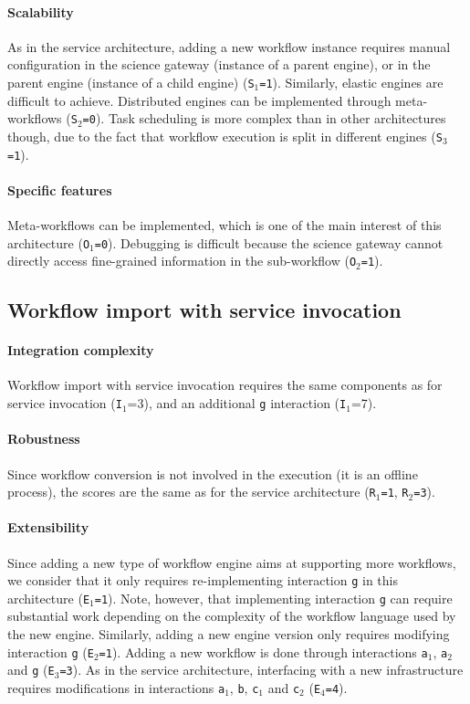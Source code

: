 \documentclass[preprint,3p,twocolumn]{elsarticle}
\begin{document}
\paragraph{Scalability} As in the service architecture, adding a new
workflow instance requires manual configuration in the science gateway
(instance of a parent engine), or in the parent engine (instance of a
child engine) (\texttt{S$_1$=1}). Similarly, elastic engines are
difficult to achieve. Distributed engines can be implemented through meta-workflows (\texttt{S$_2$=0}). Task scheduling
is more complex than in other architectures though, due to the fact
that workflow execution is split in different engines (\texttt{S$_3$=1}).

\paragraph{Specific features}
Meta-workflows can be implemented, which is one of the main interest of this
architecture (\texttt{O$_1$=0}).  Debugging is difficult because the
science gateway cannot directly access fine-grained information in the
sub-workflow (\texttt{O$_2$=1}).

\subsection{Workflow import with service invocation}

\paragraph{Integration complexity} Workflow import with service invocation
requires the same components as for service invocation
(\texttt{I$_1$}=3), and an additional \texttt{g} interaction (\texttt{I$_1$}=7).

\paragraph{Robustness} Since workflow conversion is not involved in
the execution (it is an offline process), the scores are the same as for the
service architecture (\texttt{R$_1$=1}, \texttt{R$_2$=3}).

\paragraph{Extensibility} Since adding a new type of workflow engine
aims at supporting more workflows, we consider that it only requires
re-implementing interaction \texttt{g} in this architecture  (\texttt{E$_1$=1}). Note,
however, that implementing interaction \texttt{g} can require
substantial work depending on the complexity of the workflow language used by
the new engine. Similarly, adding a
new engine version only requires modifying interaction \texttt{g}
(\texttt{E$_2$=1}).  Adding a new workflow is done through
interactions \texttt{a$_1$}, \texttt{a$_2$} and \texttt{g} (\texttt{E$_3$=3}). As in the
service architecture, interfacing with a new infrastructure requires
modifications in interactions \texttt{a$_1$}, \texttt{b}, \texttt{c$_1$}
and \texttt{c$_2$} (\texttt{E$_4$=4}).
\end{document}
